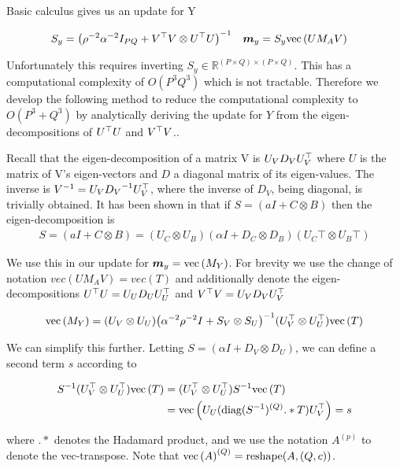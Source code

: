 Basic calculus gives us an update for Y

\begin{align}
S_y & = {\left( \rho^{-2} \alpha^{-2} I_{PQ} + V^\top V \otimes U^\top U \right)}^{-1}
&
\bm m_y & = S_y \text{vec}\left(U M_A V\right)
\end{align}

Unfortunately this requires inverting $S_y \in \mathbb{R}^{(P \times Q) \times (P \times Q)}$. This has a computational complexity of $O(P^3Q^3)$ which is not tractable. Therefore we develop the following method to reduce the computational complexity to $O(P^3 + Q^3)$ by analytically deriving the update for $Y$ from the eigen-decompositions of $U^\top U$ and $V^\top V$..

Recall that the eigen-decomposition of a matrix V is $U_V D_V U_V^\top$ where $U$ is the matrix of V's eigen-vectors and $D$ a diagonal matrix of its eigen-values. The inverse is ${V}^{-1} = U_V {D_V}^{-1} U_V^\top$, where the inverse of $D_V$, being diagonal, is trivially obtained. It has been shown in \cite{Stegle2011} that if $S = (a I + C \otimes B)$ then the eigen-decomposition is
\begin{align}
S = (a I + C \otimes B) = (U_C \otimes U_B)(\alpha I + D_C \otimes D_B)(U_C\top \otimes U_B\top)
\end{align}

We use this in our update for $\bm m_y = \text{vec}\left(M_Y\right)$. For brevity we use the change of notation $vec(U M_A V) = vec(T)$ and additionally denote the eigen-decompositions $U^\top U = U_U D_U U_U^\top$ and $V^\top V = U_V D_V U_V^\top$

\begin{align}
\text{vec}\left(M_Y\right) = (U_V \otimes U_U)
  {\left( \alpha^{-2}\rho^{-2} I + S_V \otimes S_U \right)}^{-1}
  (U_V^\top \otimes U_U^\top) \text{vec}\left(T\right)
\end{align}

We can simplify this further. Letting $S = (\alpha I + D_V \otimes D_U)$, we can define a second term $s$ according to

\begin{align}
S^{-1}(U_V^\top \otimes U_U^\top) \text{vec}\left(T\right) 
& =
(U_V^\top \otimes U_U^\top)S^{-1} \text{vec}\left(T\right) \\
& =
\text{vec}\left(U_U (\text{diag}(S^{-1})^{(Q)} .* T) U_V^\top\right) = s
\end{align}

where $.*$ denotes the Hadamard product, and we use the notation $A^{(p)}$ to denote the vec-transpose\cite{Minka2000a}. Note that $\text{vec}\left(A\right)^{(Q)} = \text{reshape}(A, (Q, c))$.

